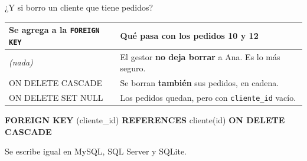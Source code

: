 \documentclass[aspectratio=169,10pt,c]{beamer}
\newcommand{\kw}[1]{\textcolor{utpRojo}{\textbf{#1}}}
\newcommand{\nuevo}[1]{{%
  \setlength{\fboxsep}{1.2pt}%
  \begingroup
  \renewcommand{\kw}[1]{\textcolor{utpNegro}{\textbf{##1}}}%
  \colorbox{yellow!45}{\textcolor{utpNegro}{#1}}%
  \endgroup}}
\newenvironment{sqlcode}[1][.86\textwidth]
  {\begin{center}\begin{lrbox}{\sqlbuf}\begin{minipage}{#1}\ttfamily\footnotesize\vspace{6pt}\raggedright}
  {\vspace{6pt}\end{minipage}\end{lrbox}\colorbox{utpGrisClaro}{\usebox{\sqlbuf}}\end{center}}
\begin{document}
\begin{frame}{¿Y si borro un cliente que tiene pedidos?}
\begin{center}
\end{center}
\vspace{0.2cm}
\begin{center}
\small
\begin{tabular}{>{\ttfamily}p{4.1cm}>{\raggedright\arraybackslash}p{7.6cm}}
\toprule
\normalfont\bfseries Se agrega a la \texttt{FOREIGN KEY} & \bfseries Qué pasa con los pedidos 10 y 12 \\
\midrule
\normalfont\textit{(nada)} & El gestor \textbf{no deja borrar} a Ana. Es lo más seguro. \\[3pt]
ON DELETE CASCADE & Se borran \textbf{también} sus pedidos, en cadena. \\[3pt]
ON DELETE SET NULL & Los pedidos quedan, pero con \texttt{cliente\_id} vacío. \\
\bottomrule
\end{tabular}
\end{center}
\vspace{0.2cm}
\begin{sqlcode}[.80\textwidth]
\kw{FOREIGN KEY} (cliente\_id) \kw{REFERENCES} cliente(id) \nuevo{\kw{ON DELETE CASCADE}}
\end{sqlcode}
\vspace{-0.1cm}
\small Se escribe igual en MySQL, SQL Server y SQLite.
\end{frame}
\end{document}
